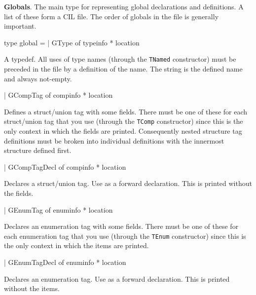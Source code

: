 \documentclass[11pt]{article}
\begin{document}
{\bf Globals}. The main type for representing global declarations and 
 definitions. A list of these form a CIL file. The order of globals in the 
 file is generally important.



\label{type:Cil.global}\begin{ocamldoccode}
type global =
  | GType of typeinfo * location
\end{ocamldoccode}
\begin{ocamldoccomment}
A typedef. All uses of type names (through the {\tt{TNamed}} constructor) 
        must be preceded in the file by a definition of the name. The string 
        is the defined name and always not-empty.
\end{ocamldoccomment}
\begin{ocamldoccode}
  | GCompTag of compinfo * location
\end{ocamldoccode}
\begin{ocamldoccomment}
Defines a struct/union tag with some fields. There must be one of 
        these for each struct/union tag that you use (through the {\tt{TComp}} 
        constructor) since this is the only context in which the fields are 
        printed. Consequently nested structure tag definitions must be 
        broken into individual definitions with the innermost structure 
        defined first.
\end{ocamldoccomment}
\begin{ocamldoccode}
  | GCompTagDecl of compinfo * location
\end{ocamldoccode}
\begin{ocamldoccomment}
Declares a struct/union tag. Use as a forward declaration. This is 
 printed without the fields.
\end{ocamldoccomment}
\begin{ocamldoccode}
  | GEnumTag of enuminfo * location
\end{ocamldoccode}
\begin{ocamldoccomment}
Declares an enumeration tag with some fields. There must be one of 
      these for each enumeration tag that you use (through the {\tt{TEnum}} 
      constructor) since this is the only context in which the items are 
      printed.
\end{ocamldoccomment}
\begin{ocamldoccode}
  | GEnumTagDecl of enuminfo * location
\end{ocamldoccode}
\begin{ocamldoccomment}
Declares an enumeration tag. Use as a forward declaration. This is 
 printed without the items.
\end{ocamldoccomment}
\end{document}
